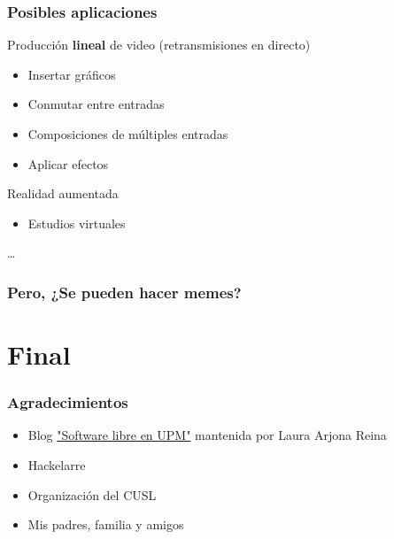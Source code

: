 \documentclass{beamer}
\begin{document}
\begin{frame}[t] \frametitle{Posibles aplicaciones}
	\begin{itemize}
		\begin{item}
			Producción \textbf{lineal} de video (retransmisiones en directo)
			\begin{itemize}
				\item{Insertar gráficos}
				\item{Conmutar entre entradas}
				\item{Composiciones de múltiples entradas}
				\item{Aplicar efectos}
			\end{itemize}
		\end{item}
		\begin{item}
			Realidad aumentada
			\begin{itemize}
				\item{Estudios virtuales}
			\end{itemize}
		\end{item}
		\begin{item}
			\ldots
		\end{item}
	\end{itemize}
\end{frame}

\begin{frame} \frametitle{Pero, ¿Se pueden hacer memes?}
\end{frame}

%
%
\section{Final}

\begin{frame} \frametitle{Agradecimientos}
	\begin{itemize}
		\item{Blog \href{http://blogs.upm.es/softwarelibre/}{"Software libre en UPM"} mantenida por Laura Arjona Reina}
		\item{Hackelarre}
		\item{Organización del CUSL}
		\item{Mis padres, familia y amigos}
	\end{itemize}
\end{frame}
\end{document}
